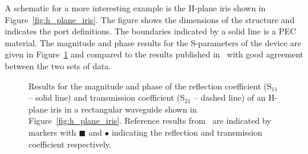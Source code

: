 A schematic for a more interesting example is the H-plane iris shown
in Figure~\ref{fig:h_plane_iris}. The figure shows the dimensions of
the structure and indicates the port definitions. The boundaries
indicated by a solid line is a PEC material. The magnitude and phase
results for the S-parameters of the device are given in
Figure~\ref{fig:h_plane_iris_S_parameters} and compared to the results
published in~\cite{PelCoc1998} with good agreement between the two
sets of data.
\begin{figure}[h]
\centering
\caption{Results for the magnitude and phase of the reflection coefficient (S$_{11}$ -- solid line) and transmission coefficient (S$_{21}$ -- dashed line) of an H-plane iris in a rectangular waveguide shown in Figure~\ref{fig:h_plane_iris}. Reference results from~\cite{PelCoc1998} are indicated by markers with $\blacksquare$ and $\bullet$ indicating the reflection and transmission coefficient respectively.}
\label{fig:h_plane_iris_S_parameters}
\end{figure}

